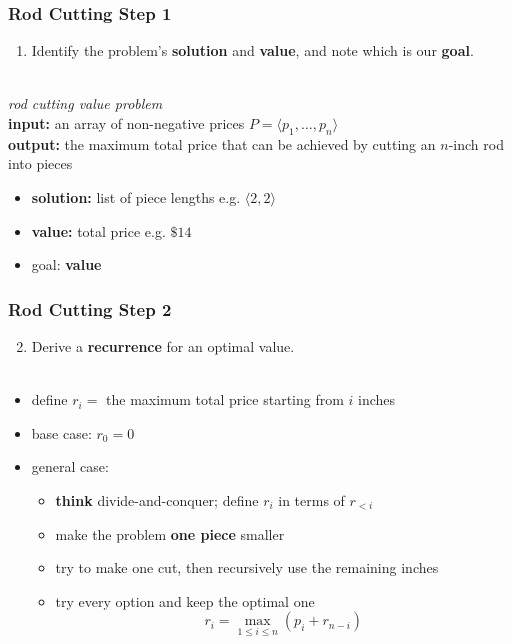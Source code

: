 \documentclass{beamer}
\newcommand{\stanza}{ \\~\ }
\begin{document}
\begin{frame} \frametitle{Rod Cutting Step 1}
\begin{enumerate}
  \item Identify the problem's \textbf{solution} and \textbf{value}, and note which is our \textbf{goal}.
  \stanza
\end{enumerate}
\emph{rod cutting value problem} \\
\textbf{input:} an array of non-negative prices $P=\langle p_1, \ldots, p_n \rangle$ \\
\textbf{output:} the maximum total price that can be achieved by cutting an $n$-inch rod into pieces
\begin{itemize}
  \item \textbf{solution:} list of piece lengths e.g. $\langle 2, 2 \rangle$
  \item \textbf{value:} total price e.g. $\$14$
  \item goal: \textbf{value}
\end{itemize}
\end{frame}

\begin{frame} \frametitle{Rod Cutting Step 2}
  \begin{enumerate}
    \setcounter{enumi}{1}
    \item Derive a \textbf{recurrence} for an optimal value.
    \stanza
  \end{enumerate}

  \begin{itemize}
    \item define $r_i = $ the maximum total price starting from $i$ inches
    \item base case: $r_0 = 0$
    \item general case:
    \begin{itemize}
      \item \textbf{think} divide-and-conquer; define $r_i$ in terms of $r_{<i}$
      \item make the problem \textbf{one piece} smaller
      \item try to make one cut, then recursively use the remaining inches
      \item try every option and keep the optimal one
      \[ r_i = \max_{1 \leq i \leq n} (p_i + r_{n-i}) \]
    \end{itemize}
  \end{itemize}
\end{frame}
  
\end{document}
